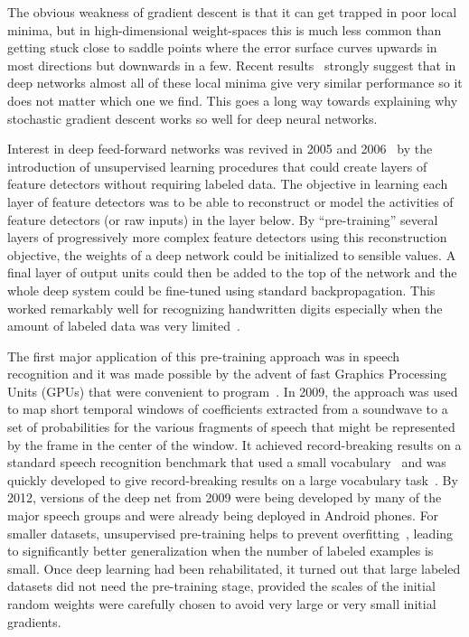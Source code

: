 \documentclass[]{article}
\begin{document}
The obvious weakness of gradient descent is that it can get trapped in poor
local minima, but in high-dimensional weight-spaces this is much less
common than getting stuck close to saddle points where the error surface
curves upwards in most directions but downwards in a few. Recent
results~\citep{Dauphin-et-al-NIPS2014-small,Choromanska-et-al-arxiv2014} strongly suggest
that in deep networks almost all of these local minima give very similar
performance so it does not matter which one we find.  This goes a long way
towards explaining why stochastic gradient descent works so well for deep
neural networks.

Interest in deep feed-forward networks was revived in
2005 and 2006~\citep{IJCAI,Hinton06-small,Bengio-nips-2006-small,ranzato-07-small} 
by the introduction
of unsupervised learning procedures that could create layers of feature
detectors without requiring labeled data. The objective in learning each
layer of feature detectors was to be able to reconstruct or model the
activities of feature detectors (or raw inputs) in the layer below.  By
``pre-training'' several layers of progressively more complex feature
detectors using this reconstruction objective, the weights of a deep
network could be initialized to sensible values.  A final layer of output
units could then be added to the top of the network and the whole deep
system could be fine-tuned using standard
backpropagation\citep{Hinton-Science2006}. This worked remarkably well for recognizing
handwritten digits especially when the amount of labeled data was very
limited~\citep{Bengio-nips-2006-small,Erhan+al-2010-small}.

The first major application of this pre-training approach was in speech
recognition and it was made possible by the advent of fast Graphics
Processing Units (GPUs) that were convenient to program~\citep{RainaICML09-small}.  
In 2009, the approach was used to map short temporal windows of coefficients extracted
from a soundwave to a set of probabilities for the various fragments of
speech that might be represented by the frame in the center of the window.
It achieved record-breaking results on a standard speech recognition
benchmark that used a small vocabulary~\citep{TIMITpaper} and was quickly
developed to give record-breaking results on a large vocabulary
task~\citep{Dahl}.  By 2012, versions of the deep net from 2009 were being
developed by many of the major speech groups\citep{Hinton-et-al-2012} and were already
being deployed in Android phones.  For smaller datasets, unsupervised
pre-training helps to prevent overfitting~\citep{Erhan+al-2010-small}, 
leading to significantly better generalization when the number of
labeled examples is small. Once deep
learning had been rehabilitated, it turned out that large labeled datasets
did not need the pre-training stage, provided the scales of the initial
random weights were carefully chosen to avoid very large or very small
initial gradients.
\end{document}
